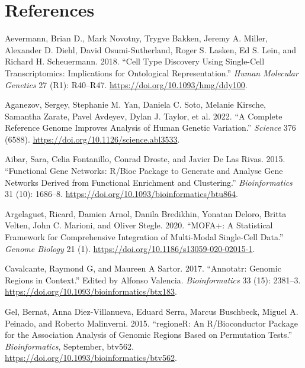 \documentclass[]{article}
\newlength{\cslhangindent}
\newenvironment{cslreferences}%
  {\setlength{\parindent}{0pt}%
  \everypar{\setlength{\hangindent}{\cslhangindent}}\ignorespaces}%
  {\par}
\begin{document}
\newpage

\hypertarget{refs}{%
\section*{References}\label{refs}}

\hypertarget{refs}{}
\begin{cslreferences}
\leavevmode\hypertarget{ref-Aevermann2018}{}%
Aevermann, Brian D., Mark Novotny, Trygve Bakken, Jeremy A. Miller, Alexander D. Diehl, David Osumi-Sutherland, Roger S. Lasken, Ed S. Lein, and Richard H. Scheuermann. 2018. ``Cell Type Discovery Using Single-Cell Transcriptomics: Implications for Ontological Representation.'' \emph{Human Molecular Genetics} 27 (R1): R40--R47. \url{https://doi.org/10.1093/hmg/ddy100}.

\leavevmode\hypertarget{ref-Aganezov2022}{}%
Aganezov, Sergey, Stephanie M. Yan, Daniela C. Soto, Melanie Kirsche, Samantha Zarate, Pavel Avdeyev, Dylan J. Taylor, et al. 2022. ``A Complete Reference Genome Improves Analysis of Human Genetic Variation.'' \emph{Science} 376 (6588). \url{https://doi.org/10.1126/science.abl3533}.

\leavevmode\hypertarget{ref-Aibar2015}{}%
Aibar, Sara, Celia Fontanillo, Conrad Droste, and Javier De Las Rivas. 2015. ``Functional Gene Networks: R/Bioc Package to Generate and Analyse Gene Networks Derived from Functional Enrichment and Clustering.'' \emph{Bioinformatics} 31 (10): 1686--8. \url{https://doi.org/10.1093/bioinformatics/btu864}.

\leavevmode\hypertarget{ref-Argelaguet2020}{}%
Argelaguet, Ricard, Damien Arnol, Danila Bredikhin, Yonatan Deloro, Britta Velten, John C. Marioni, and Oliver Stegle. 2020. ``MOFA+: A Statistical Framework for Comprehensive Integration of Multi-Modal Single-Cell Data.'' \emph{Genome Biology} 21 (1). \url{https://doi.org/10.1186/s13059-020-02015-1}.

\leavevmode\hypertarget{ref-Cavalcante2017}{}%
Cavalcante, Raymond G, and Maureen A Sartor. 2017. ``Annotatr: Genomic Regions in Context.'' Edited by Alfonso Valencia. \emph{Bioinformatics} 33 (15): 2381--3. \url{https://doi.org/10.1093/bioinformatics/btx183}.

\leavevmode\hypertarget{ref-Gel2015}{}%
Gel, Bernat, Anna Diez-Villanueva, Eduard Serra, Marcus Buschbeck, Miguel A. Peinado, and Roberto Malinverni. 2015. ``regioneR: An R/Bioconductor Package for the Association Analysis of Genomic Regions Based on Permutation Tests.'' \emph{Bioinformatics}, September, btv562. \url{https://doi.org/10.1093/bioinformatics/btv562}.


\end{cslreferences}
\end{document}
